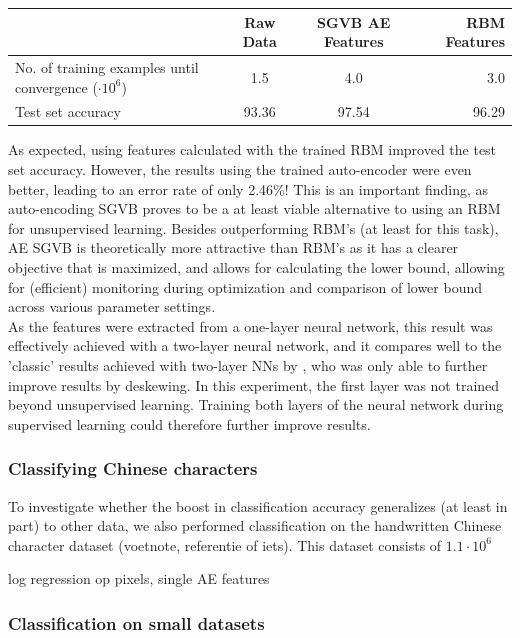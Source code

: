 \documentclass{article}
\begin{document}
\begin{table}
\begin{tabular}{|l|c|c|r|}
\hline
& Raw Data & SGVB AE Features & RBM Features \\ \hline
No. of training examples until convergence ($\cdot 10^6$) & 1.5 & 4.0 & 3.0 \\ \hline 
Test set accuracy & 93.36 & 97.54 & 96.29
\end{tabular}
\end{table}

As expected, using features calculated with the trained RBM improved the test set accuracy. However, the results using the trained auto-encoder were even better, leading to an error rate of only 2.46\%! This is an important finding, as auto-encoding SGVB proves to be a at least viable alternative to using an RBM for unsupervised learning. Besides outperforming RBM's (at least for this task), AE SGVB is theoretically more attractive than RBM's as it has a clearer objective that is maximized, and allows for calculating the lower bound, allowing for (efficient) monitoring during optimization and comparison  of lower bound across various parameter settings.\\
As the features were extracted from a one-layer neural network, this result was effectively achieved with a two-layer neural network, and it compares well to the 'classic' results achieved with two-layer NNs by \cite{lecun1998gradient}, who was only able to further improve results by deskewing. In this experiment, the first layer was not trained beyond unsupervised learning. Training both layers of the neural network during supervised learning could therefore further improve results.

\subsubsection{Classifying Chinese characters}

To investigate whether the boost in classification accuracy generalizes (at least in part) to other data, we also performed classification on the handwritten Chinese character dataset (voetnote, referentie of iets). This dataset consists of $1.1\cdot 10^6$

log regression op pixels, single AE features

\subsubsection{Classification on small datasets}
\end{document}
